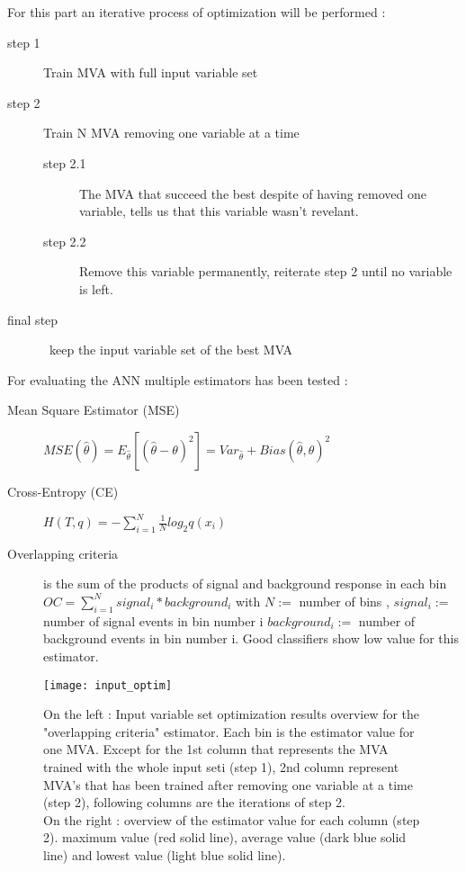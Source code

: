 For this part an iterative process of optimization will be performed :
\begin{description}
	\item [step 1] Train MVA with full input variable set
	\item [step 2] Train N MVA removing one variable at a time
	\begin{description}
		\item [step 2.1] The MVA that succeed the best despite of having removed one variable, tells us that this variable wasn't revelant.
		\item [step 2.2] Remove this variable permanently, reiterate step 2 until no variable is left.
	\end{description}
	\item [final step] keep the input variable set of the best MVA
\end{description}

For evaluating the ANN multiple estimators has been tested :
\begin{description}
	\item [Mean Square Estimator (MSE)] $ MSE(\hat{\theta}) = E_{\hat{\theta}} [(\hat{\theta} - \theta)^2] =
    Var_{\hat{\theta}} + Bias(\hat{\theta}, \theta)^2$
	\item [Cross-Entropy (CE)] $ H(T,q) = -\sum_{i=1}^{N}{\frac{1}{N} log_2 q(x_i)}$
	\item [Overlapping criteria] is the sum of the products of signal and background response in each bin $ OC =
    \sum_{i=1}^{N}{signal_i*background_i} $ with $N :=$ number of bins , $signal_i := $ number of signal events in bin
    number i $background_i := $ number of background events in bin number i. Good classifiers show low value for this estimator.
\end{description}

\begin{figure}[h!]
\centering
    \texttt{[image: input\_optim]}
    \caption{On the left : Input variable set optimization results overview for the "overlapping criteria" estimator.
    Each bin is the estimator value for one MVA. Except for
    the 1st column that represents the MVA trained with the whole input seti (step 1), 2nd column
    represent MVA's that has been trained after removing one variable at a time (step 2), following columns are the
    iterations of step 2.\\
    On the right : overview of the estimator value for each column (step 2). maximum value (red solid line), average
    value (dark blue solid line) and lowest value (light blue solid line).}
    \label{input_optim}
\end{figure}


